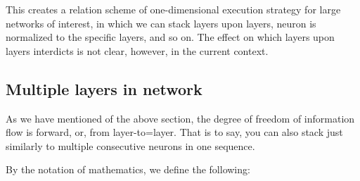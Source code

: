 This creates a relation scheme of one-dimensional execution strategy for large networks of interest, in which we can stack layers upon layers, neuron is normalized to the specific layers, and so on. The effect on which layers upon layers interdicts is not clear, however, in the current context. 

\subsection{Multiple layers in network}

As we have mentioned of the above section, the degree of freedom of information flow is forward, or, from layer-to=layer. That is to say, you can also stack just similarly to multiple consecutive neurons in one sequence. 

By the notation of mathematics, we define the following: